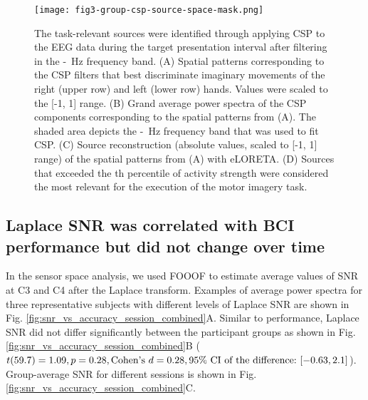 \begin{figure}[htbp]
    \centering
    \texttt{[image: fig3-group-csp-source-space-mask.png]}
    \caption{The task-relevant sources were identified through applying CSP to the EEG data during the target presentation interval after filtering in the \muLow-\muHigh~Hz frequency band. (A) Spatial patterns corresponding to the CSP filters that best discriminate imaginary movements of the right (upper row) and left (lower row) hands. Values were scaled to the [-1, 1] range. (B) Grand average power spectra of the CSP components corresponding to the spatial patterns from (A). The shaded area depicts the \muLow-\muHigh~Hz frequency band that was used to fit CSP. (C) Source reconstruction (absolute values, scaled to [-1, 1] range) of the spatial patterns from (A) with eLORETA. (D) Sources that exceeded the \cspSourceThreshold th percentile of activity strength were considered the most relevant for the execution of the motor imagery task.}
    \label{fig:group_csp_source_space_mask}
\end{figure}

\subsection{Laplace SNR was correlated with BCI performance but did not change over time}

In the sensor space analysis, we used FOOOF to estimate average values of SNR at C3 and C4 after the Laplace transform. Examples of average power spectra for three representative subjects with different levels of Laplace SNR are shown in Fig. \ref{fig:snr_vs_accuracy_session_combined}A. Similar to performance, Laplace SNR did not differ significantly between the participant groups as shown in Fig. \ref{fig:snr_vs_accuracy_session_combined}B ($t(59.7) = 1.09, p = 0.28, \text{Cohen's}~d = 0.28, 95\%~\text{CI of the difference:}~ [-0.63, 2.1]$). Group-average SNR for different sessions is shown in Fig. \ref{fig:snr_vs_accuracy_session_combined}C.

\medskip

